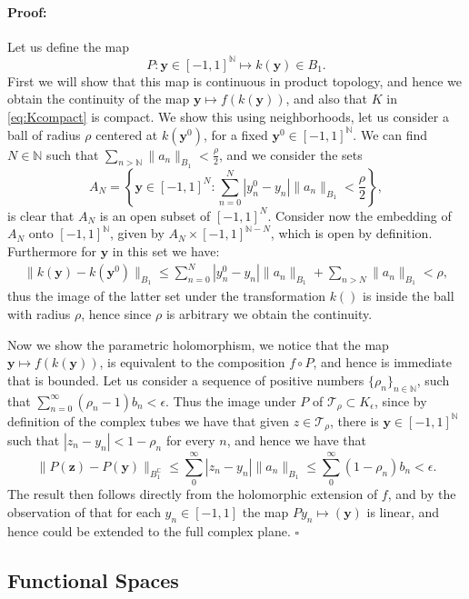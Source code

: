 \documentclass{article}
\newenvironment{proof}{\paragraph{Proof:}}{\hfill$\square$}
\newcommand{\cT}{\mathcal T}
\newcommand{\IC}{{\mathbb C}}
\newcommand{\IN}{{\mathbb N}}
\newcommand{\bz}{\bm{z}}
\newcommand{\by}{\bm{y}}
\begin{document}
\begin{proof}
Let us define the map 
$$
P : \by \in [-1,1]^{\IN} \mapsto k(\by) \in B_1.
$$
First we will show that this map is continuous in product topology, and hence we obtain the continuity of the map $\by \mapsto f(k(\by))$, and also that $K$ in \eqref{eq:Kcompact} is compact. We show this using neighborhoods, let us consider a ball of radius $\rho$ centered at $k(\by^0)$, for a fixed $\by^0 \in [-1,1]^{\IN}$. We can find $N \in \IN$ such that $\sum_{n> \IN} \|a_n\|_{B_1} < \frac{\rho}{2}$, and we consider the sets 
$$
A_N = \left\lbrace \by \in [-1,1]^{N} : \sum_{n=0}^N |y^0_n- y_n| \| a_n\|_{B_1} < \frac{\rho}{2} \right\rbrace,
$$
is clear that $A_N$ is an open subset of $[-1,1]^N$. Consider now the embedding of $A_N$ onto $[-1,1]^{\IN}$, given by $A_N \times [-1,1]^{\IN -N}$, which is open by definition. Furthermore for $\by$ in this set we have: 
\begin{align*}
\|k(\by) - k(\by^0)\|_{B_1} \leq \sum_{n=0}^N |y^0_n- y_n| \| a_n\|_{B_1} + \sum_{n > N} \| a_n\|_{B_1} < \rho,
\end{align*}
thus the image of the latter set under the transformation $k()$ is inside the ball with radius $\rho$, hence since $\rho$ is arbitrary we obtain the continuity. 

Now we show the parametric holomorphism, we notice that the map $\by \mapsto f(k(\by))$, is equivalent to the composition $f \circ P$, and hence is immediate that is bounded. Let  us consider a sequence of positive numbers $\{\rho_n\}_{n \in \IN}$, such that $\sum_{n=0}^\infty (\rho_n-1) b_n < \epsilon$. Thus the image under $P$ of $\mathcal{T}_\rho \subset K_\epsilon$, since by definition of the complex tubes we have that given $z \in \cT_\rho$, there is $\by \in [-1,1]^\IN$ such that $|z_n - y_n| < 1-\rho_n$ for every $n$, and hence we have that 
$$
\|P(\bz) -P(\by)\|_{B^{\IC}_1}  \leq 
\sum_{0}^\infty | z_n - y_n | \| a_n\|_{B_1} \leq \sum_{0}^\infty (1-\rho_n) b_n < \epsilon.
$$
The result then follows directly from the holomorphic extension of $f$, and by the observation of that for each $y_n \in [-1,1]$ the map $Py_n  \mapsto (\by)$ is linear, and hence could be extended to the full complex plane.
\end{proof}

\subsection{Functional Spaces}
\label{sec:FunctionalSpaces}
\end{document}
